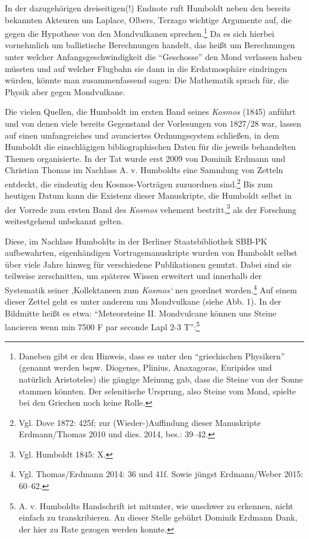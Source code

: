 In der dazugehörigen dreiseitigen(!) Endnote ruft Humboldt neben den
bereits bekannten Akteuren um Laplace, Olbers, Terzago wichtige
Argumente auf, die gegen die Hypothese von den Mondvulkanen
sprechen.\footnote{Daneben gibt er den Hinweis, dass es unter den
  \enquote{griechischen Physikern} (genannt werden bspw. Diogenes,
  Plinius, Anaxagoras, Euripides und natürlich Aristoteles) die gängige
  Meinung gab, dass die Steine von der Sonne stammen könnten. Der
  selenitische Ursprung, also Steine vom Mond, spielte bei den Griechen
  noch keine Rolle.} Da es sich hierbei vornehmlich um ballistische
Berechnungen handelt, das heißt um Berechnungen unter welcher
Anfangsgeschwindigkeit die \enquote{Geschosse} den Mond verlassen haben
müssten und auf welcher Flugbahn sie dann in die Erdatmosphäre
eindringen würden, könnte man zusammenfassend sagen: Die Mathematik
sprach für, die Physik aber gegen Mondvulkane.

Die vielen Quellen, die Humboldt im ersten Band seines \emph{Kosmos}
(1845) anführt und von denen viele bereits Gegenstand der Vorlesungen
von 1827/28 war, lassen auf einen umfangreiches und avanciertes
Ordnungssystem schließen, in dem Humboldt die einschlägigen
bibliographischen Daten für die jeweils behandelten Themen organisierte.
In der Tat wurde erst 2009 von Dominik Erdmann und Christian Thomas im
Nachlass A. v. Humboldts eine Sammlung von Zetteln entdeckt, die
eindeutig den Kosmos-Vorträgen zuzuordnen sind.\footnote{Vgl. Dove 1872:
  425f; zur (Wieder-)Auffindung dieser Manuskripte Erdmann/Thomas 2010
  und dies. 2014, bes.: 39--42.} Bis zum heutigen Datum kann die
Existenz dieser Manuskripte, die Humboldt selbst in der Vorrede zum
ersten Band des \emph{Kosmos} vehement bestritt,\footnote{Vgl. Humboldt
  1845: X.} als der Forschung weitestgehend unbekannt gelten.

Diese, im Nachlass Humboldts in der Berliner Staatsbibliothek SBB-PK
aufbewahrten, eigenhändigen Vortragsmanuskripte wurden von Humboldt
selbst über viele Jahre hinweg für verschiedene Publikationen genutzt.
Dabei sind sie teilweise zerschnitten, um späteres Wissen erweitert und
innerhalb der Systematik seiner ‚Kollektaneen zum \emph{Kosmos`} neu
geordnet worden.\footnote{Vgl. Thomas/Erdmann 2014: 36 und 41f. Sowie
  jüngst Erdmann/Weber 2015: 60--62.} Auf einem dieser Zettel geht es
unter anderem um Mondvulkane (siehe Abb. 1). In der Bildmitte heißt es
etwa: \enquote{Meteorsteine II. Mondvulcane können uns Steine lancieren
wenn min 7500 F par seconde Lapl 2-3 T}:\footnote{A. v. Humboldts
  Handschrift ist mitunter, wie unschwer zu erkennen, nicht einfach zu
  transkribieren. An dieser Stelle gebührt Dominik Erdmann Dank, der
  hier zu Rate gezogen werden konnte.}

